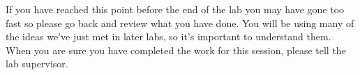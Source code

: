 If you have reached this point before the end of the lab you may have gone too fast so please go back and review what you have done. You will be using many of the ideas we've just met in later labs, so it's important to understand them.
When you are sure you have completed the work for this session, please tell the lab supervisor.






